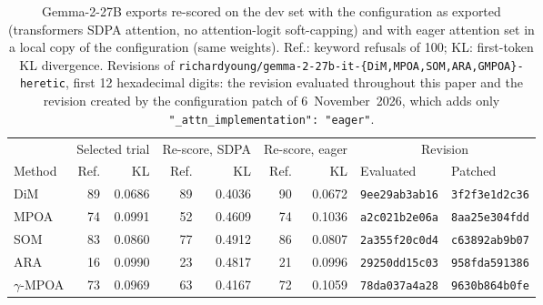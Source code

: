 
\begin{table}[t]
\centering\footnotesize
\setlength{\tabcolsep}{4pt}
\caption{Gemma-2-27B exports re-scored on the dev set with the configuration as
exported (transformers SDPA attention, no attention-logit soft-capping) and
with eager attention set in a local copy of the configuration (same weights).
Ref.: keyword refusals of 100; KL: first-token KL divergence. Revisions of
\texttt{richardyoung/gemma-2-27b-it-\{DiM,MPOA,SOM,ARA,GMPOA\}-heretic}, first
12 hexadecimal digits: the revision evaluated throughout this paper and the
revision created by the configuration patch of 6~November~2026, which adds only
\texttt{"\_attn\_implementation": "eager"}.}
\label{tab:dev-rescore-gemma2}
\begin{tabular}{lrrrrrrll}
\toprule
 & \multicolumn{2}{c}{Selected trial} & \multicolumn{2}{c}{Re-score, SDPA} & \multicolumn{2}{c}{Re-score, eager} & \multicolumn{2}{c}{Revision} \\
\cmidrule(lr){2-3}\cmidrule(lr){4-5}\cmidrule(lr){6-7}\cmidrule(lr){8-9}
Method & Ref. & KL & Ref. & KL & Ref. & KL & Evaluated & Patched \\
\midrule
DiM & 89 & 0.0686 & 89 & 0.4036 & 90 & 0.0672 & \texttt{9ee29ab3ab16} & \texttt{3f2f3e1d2c36} \\
MPOA & 74 & 0.0991 & 52 & 0.4609 & 74 & 0.1036 & \texttt{a2c021b2e06a} & \texttt{8aa25e304fdd} \\
SOM & 83 & 0.0860 & 77 & 0.4912 & 86 & 0.0807 & \texttt{2a355f20c0d4} & \texttt{c63892ab9b07} \\
ARA & 16 & 0.0990 & 23 & 0.4817 & 21 & 0.0996 & \texttt{29250dd15c03} & \texttt{958fda591386} \\
$\gamma$-MPOA & 73 & 0.0969 & 63 & 0.4167 & 72 & 0.1059 & \texttt{78da037a4a28} & \texttt{9630b864b0fe} \\
\bottomrule
\end{tabular}
\end{table}

